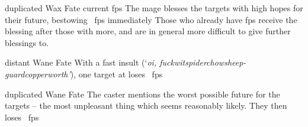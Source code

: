 \ifodd\value{diceNo}

  {duplicated}%
  {Wax}%
  {Fate}%
  {current \glspl{fp}}%
  {The mage blesses the targets with high hopes for their future, bestowing \showDam~\glspl{fp} immediately}%
  {Those who already have \glspl{fp} receive the blessing after those with more, and are in general more difficult to give further blessings to.}

  {distant}%
  {Wane}%
  {Fate}%
  {}%
  {With a fast insult (`\textit{oi, \ifcase\value{r4}fuckwit\or spiderchow\or sheep-guard\else copperworth\fi'}), one target at \spellRange{} loses \showDam~\glspl{fp}}%
  {}

\else

  {duplicated}%
  {Wane}%
  {Fate}%
  {}%
  {The caster mentions the worst possible future for the targets -- the most unpleasant thing which seems reasonably likely.
    They then loses \showDam~\glspl{fp}}%
  {}

\fi
{}

